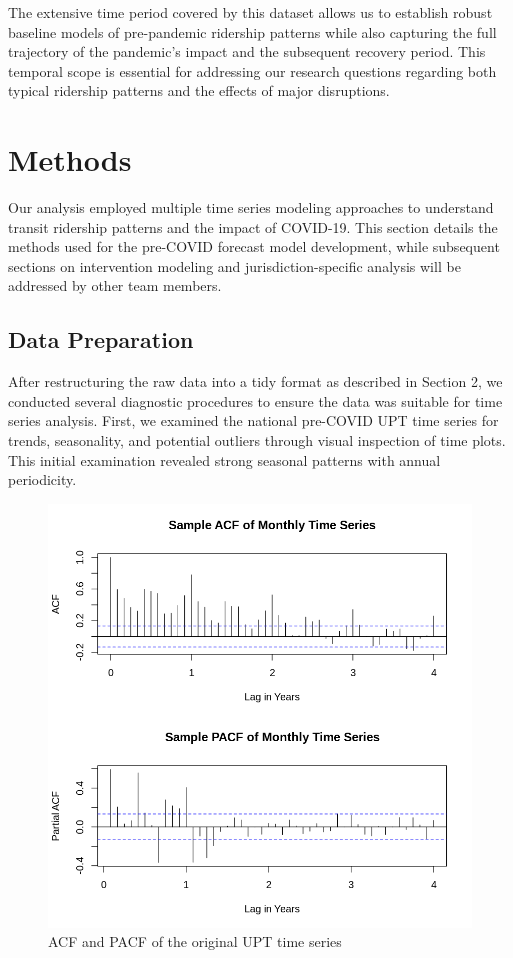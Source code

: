 \documentclass[11pt]{article}
\begin{document}
The extensive time period covered by this dataset allows us to establish robust baseline models of pre-pandemic ridership patterns while also capturing the full trajectory of the pandemic's impact and the subsequent recovery period. This temporal scope is essential for addressing our research questions regarding both typical ridership patterns and the effects of major disruptions.

\section{Methods}

Our analysis employed multiple time series modeling approaches to understand transit ridership patterns and the impact of COVID-19. This section details the methods used for the pre-COVID forecast model development, while subsequent sections on intervention modeling and jurisdiction-specific analysis will be addressed by other team members.

\subsection{Data Preparation}

After restructuring the raw data into a tidy format as described in Section 2, we conducted several diagnostic procedures to ensure the data was suitable for time series analysis. First, we examined the national pre-COVID UPT time series for trends, seasonality, and potential outliers through visual inspection of time plots. This initial examination revealed strong seasonal patterns with annual periodicity.

\begin{figure}[!ht]
\centering
\includegraphics[width=0.525\linewidth]{pre_acf_pacf.png}
\caption{ACF and PACF of the original UPT time series}
\label{f:acf_pacf_orig}
\end{figure}
\end{document}

